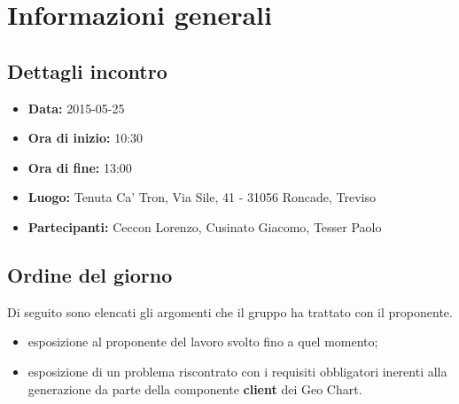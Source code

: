 

%


\section{Informazioni generali} %
\label{sec:informazioni_generali}
	\subsection{Dettagli incontro} %
	\label{sub:dettagli_incontro}
		\begin{itemize}
			\item \textbf{Data:} 2015-05-25
			\item \textbf{Ora di inizio:} 10:30
			\item \textbf{Ora di fine:} 13:00
			\item \textbf{Luogo:} Tenuta Ca' Tron, Via Sile, 41 - 31056 Roncade, Treviso
			\item \textbf{Partecipanti:} Ceccon Lorenzo, Cusinato Giacomo, Tesser Paolo
		\end{itemize}

	\subsection{Ordine del giorno} %
	\label{sub:ordine_del_giorno}
	Di seguito sono elencati gli argomenti che il gruppo ha trattato con il proponente.
		\begin{itemize}
			\item esposizione al proponente del lavoro svolto fino a quel momento;
			\item esposizione di un problema riscontrato con i requisiti obbligatori inerenti alla generazione da parte della componente \textbf{client} dei Geo Chart.
		\end{itemize}
